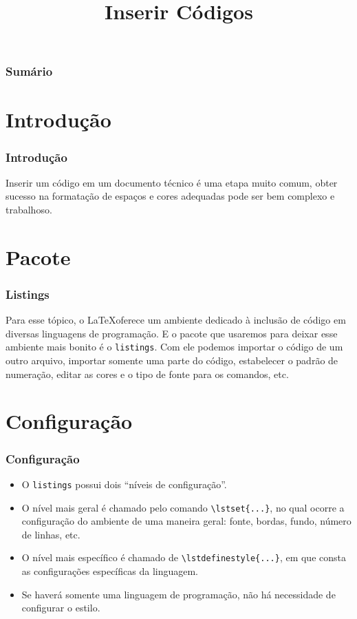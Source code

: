 \documentclass[brazilian]{beamer}
\title{Inserir Códigos}
\begin{document}
\frame{\titlepage}

\begin{frame}
    \frametitle{Sumário}
    \tableofcontents
\end{frame}
\section{Introdução}

\begin{frame}
    \frametitle{Introdução}
Inserir um código em um documento técnico é uma etapa muito comum, obter sucesso na formatação de espaços e cores adequadas pode ser bem complexo e trabalhoso. 
\end{frame}

\section{Pacote}
\begin{frame}
    \frametitle{Listings}
Para esse tópico, o \LaTeX oferece um ambiente dedicado à inclusão de código em diversas linguagens de programação. E o pacote que usaremos para deixar esse ambiente mais bonito é o \texttt{listings}. Com ele podemos importar o código de um outro arquivo, importar somente uma parte do código, estabelecer o padrão de numeração, editar as cores e o tipo de fonte para os comandos, etc.
\end{frame}

\section{Configuração}
\begin{frame}[fragile]
    \frametitle{Configuração}

    \begin{itemize}
        \item O \texttt{listings} possui dois ``níveis de configuração''.
        \item O nível mais geral é chamado pelo comando \lstinline[style=myStyleLatex]!\lstset{...}!, no qual ocorre a configuração do ambiente de uma maneira geral: fonte, bordas, fundo, número de linhas, etc.
        \item O nível mais específico é chamado de \lstinline[style=myStyleLatex]!\lstdefinestyle{...}!, em que consta as configurações específicas da linguagem.
        \item Se haverá somente uma linguagem de programação, não há necessidade de configurar o estilo.
    \end{itemize}

\end{frame}
\end{document}
